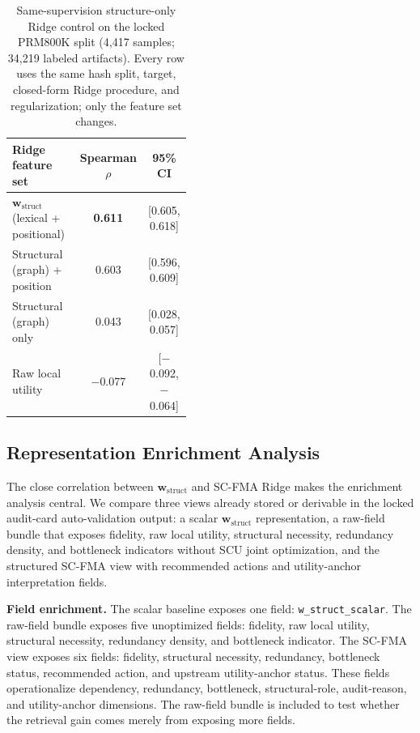 \documentclass[pdflatex,sn-mathphys-num,iicol]{sn-jnl}
\newcommand{\wstruct}{\ensuremath{\mathbf{w}_{\mathrm{struct}}}}
\begin{document}
\begin{table}[t]
\caption{Same-supervision structure-only Ridge control on the locked PRM800K split (4,417 samples; 34,219 labeled artifacts). Every row uses the same hash split, target, closed-form Ridge procedure, and regularization; only the feature set changes.}
\label{tab:structure-only-control}
\centering
\small
\renewcommand{\arraystretch}{1.08}
\begin{tabular}{Z{0.44\linewidth}cc}
\toprule
\textbf{Ridge feature set} & \textbf{Spearman $\rho$} & \textbf{95\% CI} \\
\midrule
\wstruct{} (lexical + positional) & \textbf{0.611} & [0.605, 0.618] \\
Structural (graph) + position & 0.603 & [0.596, 0.609] \\
Structural (graph) only & 0.043 & [0.028, 0.057] \\
Raw local utility & $-$0.077 & [$-$0.092, $-$0.064] \\
\bottomrule
\end{tabular}
\end{table}

\subsection{Representation Enrichment Analysis}
\label{sec:representation-enrichment}

The close correlation between \wstruct{} and SC-FMA Ridge makes the enrichment analysis central. We compare three views already stored or derivable in the locked audit-card auto-validation output: a scalar \wstruct{} representation, a raw-field bundle that exposes fidelity, raw local utility, structural necessity, redundancy density, and bottleneck indicators without SCU joint optimization, and the structured SC-FMA view with recommended actions and utility-anchor interpretation fields.

\textbf{Field enrichment.} The scalar baseline exposes one field: \texttt{w\_struct\_scalar}. The raw-field bundle exposes five unoptimized fields: fidelity, raw local utility, structural necessity, redundancy density, and bottleneck indicator. The SC-FMA view exposes six fields: fidelity, structural necessity, redundancy, bottleneck status, recommended action, and upstream utility-anchor status. These fields operationalize dependency, redundancy, bottleneck, structural-role, audit-reason, and utility-anchor dimensions. The raw-field bundle is included to test whether the retrieval gain comes merely from exposing more fields.
\end{document}
